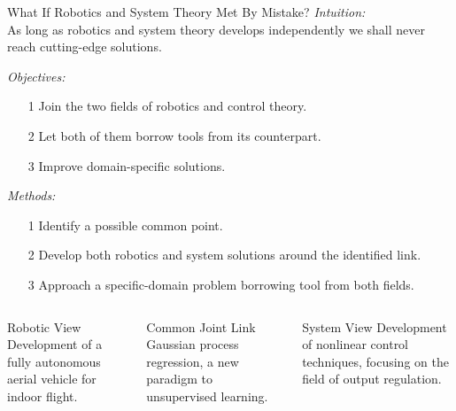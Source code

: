 \documentclass[10pt,aspectratio=169]{beamer}
\begin{document}
\begin{frame}[t]{What If Robotics and System Theory Met By Mistake?}
	\vfill
	\textcolor{emph@O4S}{\textit{Intuition:}} \\
	As long as robotics and system theory develops independently we shall never reach cutting-edge solutions.

	\vspace{0.2cm}
	\textcolor{emph@O4S}{\textit{Objectives:}} \\
	\begin{itemize}
		\item[1] Join the two fields of robotics and control theory.
		\item[2] Let both of them borrow tools from its counterpart.
		\item[3] Improve domain-specific solutions.
	\end{itemize}

	\vspace{0.2cm}
	\textcolor{emph@O4S}{\textit{Methods:}} \\
	\begin{itemize}
		\item[1] Identify a possible common point.
		\item[2] Develop both robotics and system solutions around the identified link.
		\item[3] Approach a specific-domain problem borrowing tool from both fields.
	\end{itemize}

	\vfill
	\begin{columns}
		\begin{block}{\centering Robotic View}
			\centering
			Development of a fully autonomous aerial vehicle for indoor flight.
		\end{block}

		\begin{alertblock}{\centering Common Joint Link}
			\centering
			Gaussian process regression, a new paradigm to unsupervised learning.
		\end{alertblock}

		\begin{exampleblock}{\centering System View}
			\centering
			Development of nonlinear control techniques, focusing on the field of output regulation.
		\end{exampleblock}
	\end{columns}
\end{frame}
\end{document}
